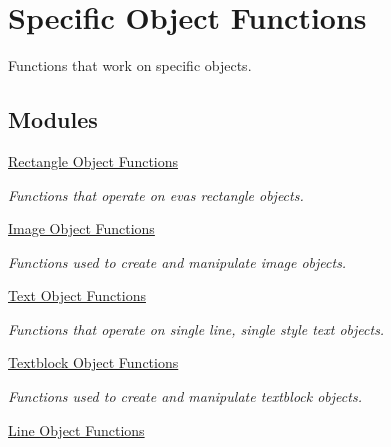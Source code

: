 \section{Specific Object Functions}
\label{group__Evas__Object__Specific}


Functions that work on specific objects.  


\subsection*{Modules}
\begin{DoxyCompactItemize}
\item 
\hyperlink{group__Evas__Object__Rectangle}{Rectangle Object Functions}


\begin{DoxyCompactList}\small\item\em Functions that operate on evas rectangle objects. \item\end{DoxyCompactList}

\item 
\hyperlink{group__Evas__Object__Image}{Image Object Functions}


\begin{DoxyCompactList}\small\item\em Functions used to create and manipulate image objects. \item\end{DoxyCompactList}

\item 
\hyperlink{group__Evas__Object__Text}{Text Object Functions}


\begin{DoxyCompactList}\small\item\em Functions that operate on single line, single style text objects. \item\end{DoxyCompactList}

\item 
\hyperlink{group__Evas__Object__Textblock}{Textblock Object Functions}


\begin{DoxyCompactList}\small\item\em Functions used to create and manipulate textblock objects. \item\end{DoxyCompactList}

\item 
\hyperlink{group__Evas__Line__Group}{Line Object Functions}



\end{DoxyCompactItemize}
